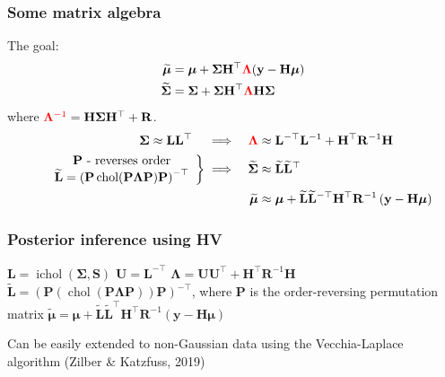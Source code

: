 \documentclass[usenames,dvipsnames,svgnames,table]{beamer}
\newcommand{\by}{\mathbf{y}}
\newcommand{\bS}{\mathbf{S}}
\newcommand{\bP}{\mathbf{P}}
\newcommand{\bL}{\mathbf{L}}
\newcommand{\bH}{\mathbf{H}}
\newcommand{\bU}{\mathbf{U}}
\newcommand{\bR}{\mathbf{R}}
\newcommand{\bfmu}{\bm{\mu}}
\newcommand{\bfSigma}{\bm{\Sigma}}
\newcommand{\bfLambda}{\bm{\Lambda}}
\DeclareMathOperator*{\ichol}{\text{ichol}}
\DeclareMathOperator*{\chol}{\text{chol}}
\begin{document}
\begin{frame}
	\frametitle{Some matrix algebra}
	The goal:
	\begin{align*}
		\widetilde{\bfmu} &= \bfmu +  \bfSigma\bH^\top {\color{red}\bfLambda} (\by - \bH\bfmu)\\
		\widetilde{\bfSigma} &= \bfSigma +  \bfSigma\bH^\top {\color{red}\bfLambda} \bH\bfSigma
	\end{align*}
	where ${\color{red} \bfLambda^{-1}} = \bH\bfSigma\bH^\top + \bR$.\pause
	\begin{align*}
	& &\bfSigma \approx \bL\bL^\top \quad &\implies &{\color{red}\bfLambda} &\approx \bL^{-\top}\bL^{-1} + \bH^\top\bR^{-1}\bH\\
	& &\left.\begin{array}{c} \bP\text{ - reverses order}\\ \widetilde{\bL} = \left( \bP\chol(\bP\bfLambda\bP)\bP\right)^{-\top} \end{array} \right\}  & \implies &\widetilde{\bfSigma} & \approx \widetilde{\bL} \widetilde{\bL}^\top\\
	& & & &\widetilde{\bfmu} &\approx \bfmu +\widetilde{\bL}\widetilde{\bL}^{-\top}\bH^{\top}\bR^{-1}\left(\by - \bH \bfmu\right)
	\end{align*}
\end{frame}



\begin{frame}
	\frametitle{Posterior inference using HV}	
	\begin{algorithm}[H]
		\KwInput{$\by, \bS, \bfmu, \bfSigma, \bH, \bR$}
		\vspace{0.3cm}
		\KwResult{$\widetilde\bfmu$ and $\widetilde\bL$}
		\vspace{0.3cm}
		\begin{algorithmic}[1]
			\STATE $\bL = \ichol(\bfSigma, \bS)$
			\vspace{0.1cm}
			\STATE $\bU = \bL^{-\top}$
			\vspace{0.1cm}
			\STATE $\bfLambda = \bU\bU^\top + \bH^\top\bR^{-1}\bH$
			\vspace{0.1cm}
			\STATE $\widetilde{\bL} = (\bP\left(\chol(\bP\bfLambda\bP)\right)\bP)^{-\top}$, where $\bP$ is the order-reversing permutation matrix
			\vspace{0.1cm}
			\STATE $\widetilde{\bfmu} = \bfmu + \widetilde{\bL}\widetilde{\bL}^\top\bH^{\top}\bR^{-1}\left(\by - \bH \bfmu\right)$
		\end{algorithmic}
		\label{alg:VF}
	\end{algorithm}
	\vfill\pause
	Can be easily extended to non-Gaussian data using the Vecchia-Laplace algorithm (Zilber \& Katzfuss, 2019)
\end{frame}
\end{document}
